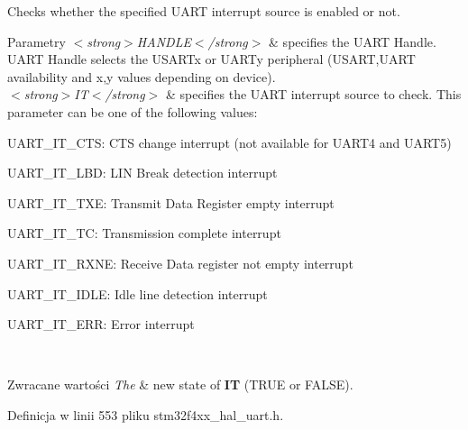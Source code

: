 Checks whether the specified U\+A\+RT interrupt source is enabled or not. 


\begin{DoxyParams}{Parametry}
{\em $<$strong$>$\+H\+A\+N\+D\+L\+E$<$/strong$>$} & specifies the U\+A\+RT Handle. U\+A\+RT Handle selects the U\+S\+A\+R\+Tx or U\+A\+R\+Ty peripheral (U\+S\+A\+RT,U\+A\+RT availability and x,y values depending on device). \\
\hline
{\em $<$strong$>$\+I\+T$<$/strong$>$} & specifies the U\+A\+RT interrupt source to check. This parameter can be one of the following values\+: \begin{DoxyItemize}
\item U\+A\+R\+T\+\_\+\+I\+T\+\_\+\+C\+TS\+: C\+TS change interrupt (not available for U\+A\+R\+T4 and U\+A\+R\+T5) \item U\+A\+R\+T\+\_\+\+I\+T\+\_\+\+L\+BD\+: L\+IN Break detection interrupt \item U\+A\+R\+T\+\_\+\+I\+T\+\_\+\+T\+XE\+: Transmit Data Register empty interrupt \item U\+A\+R\+T\+\_\+\+I\+T\+\_\+\+TC\+: Transmission complete interrupt \item U\+A\+R\+T\+\_\+\+I\+T\+\_\+\+R\+X\+NE\+: Receive Data register not empty interrupt \item U\+A\+R\+T\+\_\+\+I\+T\+\_\+\+I\+D\+LE\+: Idle line detection interrupt \item U\+A\+R\+T\+\_\+\+I\+T\+\_\+\+E\+RR\+: Error interrupt \end{DoxyItemize}
\\
\hline
\end{DoxyParams}

\begin{DoxyRetVals}{Zwracane wartości}
{\em The} & new state of {\bfseries IT} (T\+R\+UE or F\+A\+L\+SE). \\
\hline
\end{DoxyRetVals}


Definicja w linii 553 pliku stm32f4xx\+\_\+hal\+\_\+uart.\+h.

\mbox{\label{group___u_a_r_t___exported___macros_ga0a26cb3a576c2700f76a7c697c86a499}} 
